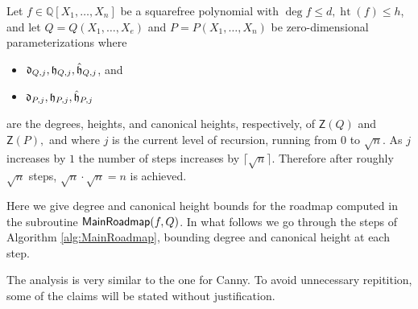 \documentclass[12pt]{article}
\DeclareMathOperator{\htt}{ht}
\def\Q{\mathbb{Q}}
\def\fd{\frak{d}}
\def\fh{\frak{h}}
\def\Zeroes{\mathsf{Z}}
\def\MainRoadmap{{\sf MainRoadmap}}
\def\Q{\mathbb{Q}}
\begin{document}
Let $f \in \Q[X_1,\hdots,X_n]$ be a squarefree polynomial with $\deg f \leq d,\htt(f) \leq h$, and let $Q = Q(X_1,\hdots,X_e)$ and $P = P(X_1,\hdots,X_n)$ be zero-dimensional parameterizations where
\begin{itemize}
    \item $\frak{d}_{Q,j}, \frak{h}_{Q,j},\hat{\frak{h}}_{Q,j}$, and 
    \item $\fd_{P,j}, \fh_{P,j},\hat{\frak{h}}_{P,j}$
\end{itemize}
are the degrees, heights, and canonical heights, respectively, of $\Zeroes(Q)$ and $\Zeroes(P),$ and
where $j$ is the current level of recursion, running from $0$ to $\sqrt{n}$. As $j$ increases by $1$ the number of steps increases by $\lceil\sqrt{n}\rceil$. Therefore after roughly $\sqrt{n}$ steps, $\sqrt{n}\cdot\sqrt{n}=n$ is achieved. 


Here we give degree and canonical height bounds for the roadmap computed in the subroutine $\MainRoadmap(f, Q)$. In what follows we go through the steps of Algorithm \ref{alg:MainRoadmap}, bounding degree and canonical height at each step.

The analysis is very similar to the one for Canny. To avoid unnecessary repitition, some of the claims will be stated without justification. 

 
\end{document}

